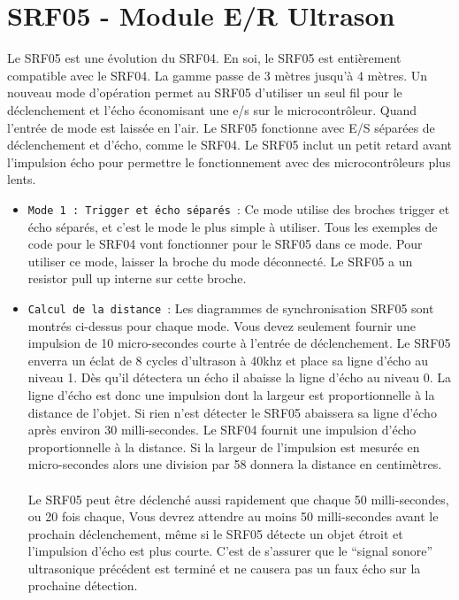 \documentclass[a4paper, 12pt]{book}
\begin{document}
\chapter{SRF05 - Module E/R Ultrason}
Le SRF05 est une évolution du SRF04. En soi, le SRF05 est entièrement compatible avec le SRF04. La gamme passe de 3 mètres jusqu’à 4 mètres. Un nouveau mode d’opération permet au SRF05 d’utiliser un seul fil pour le déclenchement et l’écho économisant une e/s sur le microcontrôleur. Quand l’entrée de mode est laissée en l’air. Le SRF05 fonctionne avec E/S séparées de déclenchement et d’écho, comme le SRF04. Le SRF05 inclut un petit retard avant l’impulsion écho pour permettre le fonctionnement avec des microcontrôleurs plus lents.\\
\begin{itemize}
\item \texttt{Mode 1 : Trigger et écho séparés}~:
Ce mode utilise des broches trigger et écho séparés, et c’est le mode le plus simple à utiliser. Tous les exemples de code pour le SRF04 vont fonctionner pour le SRF05 dans ce mode. Pour utiliser ce mode, laisser la broche du mode déconnecté. Le SRF05 a un resistor pull up interne sur cette broche.\\

\item \texttt{Calcul de la distance}~:
Les diagrammes de synchronisation SRF05 sont montrés ci-dessus pour chaque mode. Vous devez seulement fournir une impulsion de 10 micro-secondes courte à l’entrée de déclenchement. Le SRF05 enverra un éclat de 8 cycles d’ultrason à 40khz et place sa ligne d’écho au niveau 1. Dès qu’il détectera un écho il abaisse la ligne d’écho au niveau 0. La ligne d’écho est donc une impulsion dont la largeur est proportionnelle à la distance de l’objet. Si rien n’est détecter le SRF05 abaissera sa ligne d’écho après environ 30 milli-secondes. Le SRF04 fournit une impulsion d’écho proportionnelle à la distance. Si la largeur de l’impulsion est mesurée en micro-secondes alors une division par 58 donnera la distance en centimètres.\\\\

Le SRF05 peut être déclenché aussi rapidement que chaque 50 milli-secondes, ou 20 fois chaque, Vous devrez attendre au moins 50 milli-secondes avant le prochain déclenchement, même si le SRF05 détecte un objet étroit et l’impulsion d’écho est plus courte. C’est de s’assurer que le “signal sonore” ultrasonique précédent est terminé et ne causera pas un faux écho sur la prochaine détection.
\end{itemize}
\end{document}
